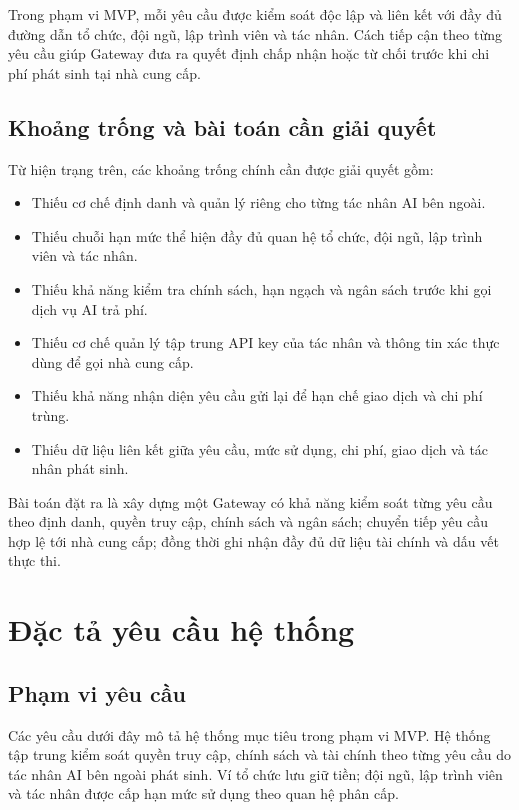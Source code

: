 Trong phạm vi MVP, mỗi yêu cầu được kiểm soát độc lập và liên kết với đầy đủ đường dẫn tổ chức, đội ngũ, lập trình viên và tác nhân. Cách tiếp cận theo từng yêu cầu giúp Gateway đưa ra quyết định chấp nhận hoặc từ chối trước khi chi phí phát sinh tại nhà cung cấp.


\subsection*{Khoảng trống và bài toán cần giải quyết}

Từ hiện trạng trên, các khoảng trống chính cần được giải quyết gồm:

\begin{itemize}
    \item Thiếu cơ chế định danh và quản lý riêng cho từng tác nhân AI bên ngoài.
    \item Thiếu chuỗi hạn mức thể hiện đầy đủ quan hệ tổ chức, đội ngũ, lập trình viên và tác nhân.
    \item Thiếu khả năng kiểm tra chính sách, hạn ngạch và ngân sách trước khi gọi dịch vụ AI trả phí.
    \item Thiếu cơ chế quản lý tập trung API key của tác nhân và thông tin xác thực dùng để gọi nhà cung cấp.
    \item Thiếu khả năng nhận diện yêu cầu gửi lại để hạn chế giao dịch và chi phí trùng.
    \item Thiếu dữ liệu liên kết giữa yêu cầu, mức sử dụng, chi phí, giao dịch và tác nhân phát sinh.
\end{itemize}

Bài toán đặt ra là xây dựng một Gateway có khả năng kiểm soát từng yêu cầu theo định danh, quyền truy cập, chính sách và ngân sách; chuyển tiếp yêu cầu hợp lệ tới nhà cung cấp; đồng thời ghi nhận đầy đủ dữ liệu tài chính và dấu vết thực thi.

\section{Đặc tả yêu cầu hệ thống}

\subsection*{Phạm vi yêu cầu}

Các yêu cầu dưới đây mô tả hệ thống mục tiêu trong phạm vi MVP. Hệ thống tập trung kiểm soát quyền truy cập, chính sách và tài chính theo từng yêu cầu do tác nhân AI bên ngoài phát sinh. Ví tổ chức lưu giữ tiền; đội ngũ, lập trình viên và tác nhân được cấp hạn mức sử dụng theo quan hệ phân cấp.


